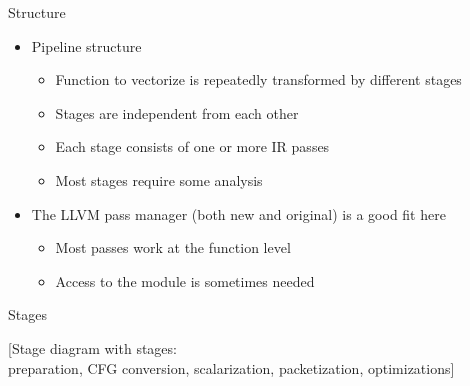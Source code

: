 \begin{frame}{Structure}

\begin{itemize}
    \item Pipeline structure
    \begin{itemize}
        \item Function to vectorize is repeatedly transformed by different stages
        \item Stages are independent from each other
        \item Each stage consists of one or more IR passes
        \item Most stages require some analysis
    \end{itemize}
    
    \item The LLVM pass manager (both new and original) is a good fit here
    \begin{itemize}
        \item Most passes work at the function level
        \item Access to the module is sometimes needed
    \end{itemize}
\end{itemize}

\end{frame}


\begin{frame}[c]{Stages}

[Stage diagram with stages:\\ preparation, CFG conversion, scalarization, packetization, optimizations]

\end{frame}


